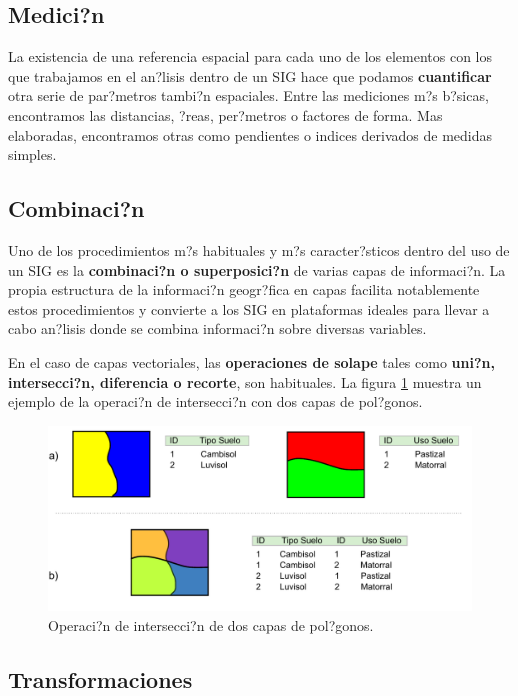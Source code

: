 \subsection{Medici?n} 

La existencia de una referencia espacial para cada uno de los elementos con los que trabajamos en el an?lisis dentro de un SIG hace que podamos \textbf{cuantificar} otra serie de par?metros tambi?n espaciales. Entre las mediciones m?s b?sicas, encontramos las distancias, ?reas, per?metros o factores de forma. Mas elaboradas, encontramos otras como pendientes o indices derivados de medidas simples.


\subsection{Combinaci?n}

Uno de los procedimientos m?s habituales y m?s caracter?sticos dentro del uso de un SIG es la \textbf{combinaci?n o superposici?n} de varias capas de informaci?n. La propia estructura de la informaci?n geogr?fica en capas facilita notablemente estos procedimientos y convierte a los SIG en plataformas ideales para llevar a cabo an?lisis donde se combina informaci?n sobre diversas variables.

En el caso de capas vectoriales, las \textbf{operaciones de solape} tales como \textbf{uni?n, intersecci?n, diferencia o recorte}, son habituales. La figura \ref{Fig:Interseccion} muestra un ejemplo de la operaci?n de intersecci?n con dos capas de pol?gonos.

\begin{figure}[!hbt]   
\centering
\includegraphics[width= \columnwidth]{../es/Analisis/Interseccion.pdf}
\caption{\small Operaci?n de intersecci?n de dos capas de pol?gonos.}
\label{Fig:Interseccion} 
\end{figure}

\subsection{Transformaciones}

